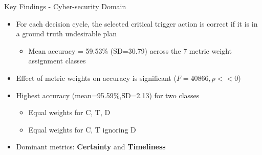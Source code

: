 \begin{frame}{Key Findings - Cyber-security Domain}

\begin{itemize}
\item For each decision cycle, the selected critical trigger action is correct if it is in a ground truth undesirable plan

\begin{itemize}
\item Mean accuracy = 59.53\% (SD=30.79) across the 7 metric weight assignment classes
\end{itemize}

\item Effect of metric weights on accuracy is significant ($F=40866, p<<0$)
\item Highest accuracy (mean=95.59\%,SD=2.13) for two classes
\begin{itemize}
\item Equal weights for C, T, D
\item Equal weights for C, T ignoring D
\end{itemize}

\item Dominant metrics: \textbf{Certainty} and \textbf{Timeliness}
\end{itemize}

\end{frame}


